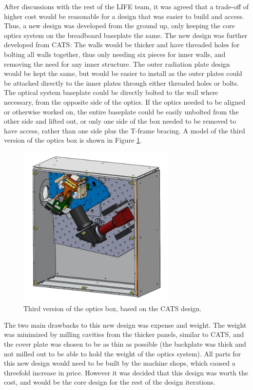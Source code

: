After discussions with the rest of the LIFE team, it was agreed that a trade-off of higher cost would be reasonable for a design that was easier to build and access. Thus, a new design was developed from the ground up, only keeping the core optics system on the breadboard baseplate the same. The new design was further developed from CATS: The walls would be thicker and have threaded holes for bolting all walls together, thus only needing six pieces for inner walls, and removing the need for any inner structure. The outer radiation plate design would be kept the same, but would be easier to install as the outer plates could be attached directly to the inner plates through either threaded holes or bolts. The optical system baseplate could be directly bolted to the wall where necessary, from the opposite side of the optics. If the optics needed to be aligned or otherwise worked on, the entire baseplate could be easily unbolted from the other side and lifted out, or only one side of the box needed to be removed to have access, rather than one side plus the T-frame bracing. A model of the third version of the optics box is shown in Figure \ref{fig:OB_V3}. 

\begin{figure}
    \centering
    \includegraphics[width=0.7\textwidth]{chap3_images/LIFE_V3_images/Optics_Box_V2.JPG}
    \caption{Third version of the optics box, based on the CATS design.}
    \label{fig:OB_V3}
\end{figure}

The two main drawbacks to this new design was expense and weight. The weight was minimized by milling cavities from the thicker panels, similar to CATS, and the cover plate was chosen to be as thin as possible (the backplate was thick and not milled out to be able to hold the weight of the optics system). All parts for this new design would need to be built by the machine shops, which caused a threefold increase in price. However it was decided that this design was worth the cost, and would be the core design for the rest of the design iterations.

